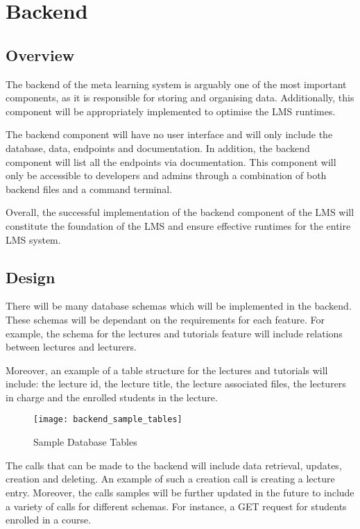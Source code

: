 \newpage
\section{Backend}
\subsection{Overview}
The backend of the meta learning system is arguably one of the most important components, as it is responsible for storing and 
organising data. Additionally, this component will be appropriately implemented to optimise the LMS runtimes.

The backend component will have no user interface and will only include the database, data, endpoints and documentation. In addition, 
the backend component will list all the endpoints via documentation. This component will only be accessible to developers and admins through 
a combination of both backend files and a command terminal.

Overall, the successful implementation of the backend component of the LMS will constitute the foundation of the LMS and 
ensure effective runtimes for the entire LMS system.

\subsection{Design}
There will be many database schemas which will be implemented in the backend. These schemas will be dependant on the requirements for each 
feature. For example, the schema for the lectures and tutorials feature will include relations between lectures and lecturers.  

Moreover, an example of a table structure for the lectures and tutorials will include: the lecture id, the lecture title, the 
lecture associated files, the lecturers in charge and the enrolled students in the lecture. 

\begin{figure}[h!]
    \centering
    \texttt{[image: backend\_sample\_tables]}
    \caption{Sample Database Tables}
\end{figure}

The calls that can be made to the backend will include data retrieval, updates, creation and deleting. An example of such a 
creation call is creating a lecture entry. Moreover, the calls samples will be further updated in the future to include a variety 
of calls for different schemas. For instance, a GET request for students enrolled in a course.


